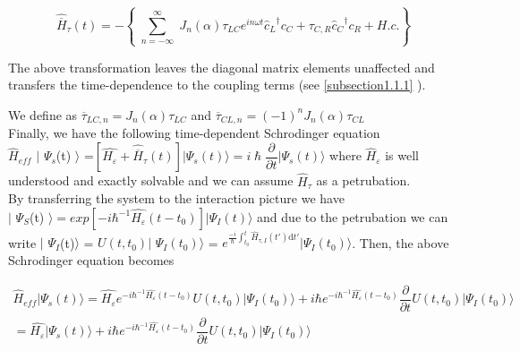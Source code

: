  \begin{equation} \label{eq:2}
\widehat{\overline{H}}_{\tau}(t) = - \left\lbrace  \sum_{\substack{n={-\infty}}}^{\infty} J_n (\alpha) \tau_{LC} e^{i n \omega t} {\widehat{c}_{L}}^{\dagger} c_{C} + \tau_{C,R}{\widehat{c}_{C}}^{\dagger} c_{R} + H.c. \right\rbrace 
 \end{equation}
 
 The above transformation leaves the diagonal matrix elements unaffected and transfers the time-dependence to the coupling terms (see \ref{subsection1.1.1} ).

We define as  $\overline{\tau}_{LC,n} = J_n (\alpha) \tau_{LC} $ and $\overline{\tau}_{CL,n}= (-1)^{n} J_n (\alpha) \tau_{CL}$ 
 \\
 
 Finally, we have the following time-dependent Schrodinger equation 
 \\$\widehat{H}_{eff}$ $\vert$ $\Psi_{s}$(t) $\rangle$ =$\left[ \widehat{H_\varepsilon} + \widehat{\overline{H}}_{\tau}(t)\right]\vert\Psi_{s}(t) \rangle = i\hslash\dfrac{\partial}{\partial t }\vert\Psi_{s}(t) \rangle$ where  $\widehat{H}_{\varepsilon}$ is well understood and exactly solvable and we can assume $\widehat{H}_{\tau}$ as a petrubation.  
\\

 By transferring the system to the interaction picture we have \\ $\vert$ $\Psi_{S}$(t) $\rangle = exp\left[ -i \hbar^{-1}\widehat{H_{\varepsilon}}(t-t_{0}) \right]  \vert \Psi_{I} (t) \rangle$ and due to the petrubation we can write $\vert$ $\Psi_{I}$(t)$\rangle$ = $ U(t,t_{0}) \vert$ $\Psi_{I}(t_{0})\rangle$ =  $ e ^{ \frac{-i}{\hbar}\int_{t_0}^{t} \widehat{H}_{\tau,I} (t') \mathrm{d}t'} \vert\Psi_{I}(t_{0})\rangle$. Then, the above Schrodinger equation becomes 
 
  \begin{multline} \label{eq:3}
 \widehat{H}_{eff} \vert \Psi_{s} (t) \rangle =  \widehat{H_{\varepsilon}}  e^ {-i \hbar^{-1} \widehat{H_{\varepsilon}} (t-t_{0}) } U(t,t_{0}) \vert\Psi_{I}(t_{0})\rangle + 
 i \hbar e^{-i \hbar^{-1} \widehat{H_{\varepsilon}}(t-t_{0})} \dfrac{\partial}{\partial t }  U(t,t_{0}) \vert\Psi_{I}(t_0)\rangle 
 \\
 = \widehat{H_{\varepsilon}} \vert \Psi_{s} (t) \rangle + i \hbar e^{-i \hbar^{-1} \widehat{H_{\varepsilon}}(t-t_{0})} \dfrac{\partial}{\partial t } U(t,t_{0}) \vert\Psi_{I}(t_0)\rangle 
 \end{multline}
 

